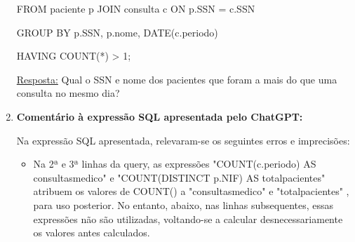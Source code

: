 \documentclass[12pt,a4paper]{article}
\begin{document}
\begin{enumerate}
    \vspace*{1pt}
    \noindent
    FROM paciente p JOIN consulta c ON p.SSN = c.SSN

    \vspace*{1pt}
    \noindent
    GROUP BY p.SSN, p.nome, DATE(c.periodo)

    \vspace*{1pt}
    \noindent
    HAVING COUNT(*) > 1;
    \rmfamily

    \vspace{10pt}
    \noindent
    \underline{Resposta:} Qual o SSN e nome dos pacientes que foram a mais do que uma consulta no mesmo dia?

    \item \textbf{Comentário à expressão SQL apresentada pelo ChatGPT:}

    Na expressão SQL apresentada, relevaram-se os seguintes erros e imprecisões:
    \begin{itemize}
        \item Na 2ª e 3ª linhas da query, as expressões \ttfamily "COUNT(c.periodo) AS consultas\textunderscore medico" \rmfamily e \ttfamily "COUNT(DISTINCT p.NIF) AS total\textunderscore pacientes" \rmfamily atribuem os valores de \ttfamily COUNT() \rmfamily a \ttfamily "consultas\textunderscore medico" \rmfamily e \ttfamily "total\textunderscore pacientes" \rmfamily, para uso posterior. No entanto, abaixo, nas linhas subsequentes, essas expressões não são utilizadas, voltando-se a calcular desnecessariamente os valores antes calculados.



\end{itemize}
\end{enumerate}
\end{document}

